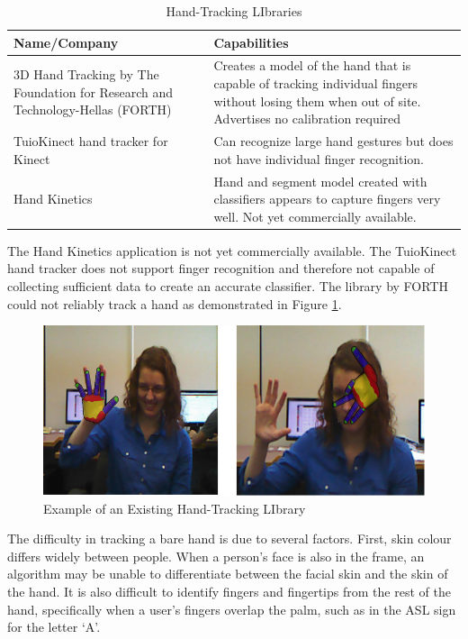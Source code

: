 \documentclass[12pt]{article}
\begin{document}
\begin{table}[h!]
\centering
\caption{Hand-Tracking LIbraries}
\label{table:libraries}
\begin{tabular}{|p{5cm}| p{11cm} |}
\hline
\textbf{Name/Company} & \textbf{Capabilities} \\ \hline
3D Hand Tracking by The Foundation for Research and Technology-Hellas (FORTH) \cite{forth} &
Creates a model of the hand that is capable of tracking individual fingers without losing them when out of site.
Advertises no calibration required \\ \hline
TuioKinect hand tracker for Kinect \cite{tuio} &
Can recognize large hand gestures but does not have individual finger recognition. \\ \hline
Hand Kinetics \cite{kinetics}  &
Hand and segment model created with classifiers appears to capture fingers very well. Not yet commercially available. \\ \hline
\end{tabular}
\end{table}


The Hand Kinetics application is not yet commercially available. The TuioKinect hand tracker does not support finger recognition and therefore not capable of collecting sufficient data to create an accurate classifier. The library by FORTH could not reliably track a hand as demonstrated in Figure \ref{fig:FORTH}. 

\begin{figure}[h]
  \centering
  \includegraphics[scale=1]{FORTH.png}
  \caption{Example of an Existing Hand-Tracking LIbrary}
  \label{fig:FORTH}
\end{figure}

The difficulty in tracking a bare hand is due to several factors. First, skin colour differs widely between people. When a person’s face is also in the frame, an algorithm may be unable to differentiate between the facial skin and the skin of the hand. It is also difficult to identify fingers and fingertips from the rest of the hand, specifically when a user’s fingers overlap the palm, such as in the ASL sign for the letter ‘A’.
\end{document}
